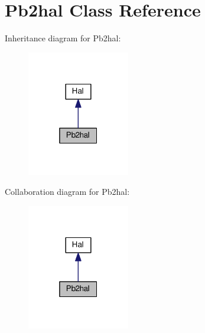 \hypertarget{class_pb2hal}{}\section{Pb2hal Class Reference}
\label{class_pb2hal}


Inheritance diagram for Pb2hal\+:
\nopagebreak
\begin{figure}[H]
\begin{center}
\leavevmode
\includegraphics[width=127pt]{class_pb2hal__inherit__graph}
\end{center}
\end{figure}


Collaboration diagram for Pb2hal\+:
\nopagebreak
\begin{figure}[H]
\begin{center}
\leavevmode
\includegraphics[width=127pt]{class_pb2hal__coll__graph}
\end{center}
\end{figure}
